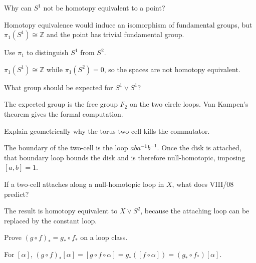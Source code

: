 \begin{problem}\label{prob:viii09-12}
Why can \(S^1\) not be homotopy equivalent to a point?
\end{problem}
\begin{solution}
Homotopy equivalence would induce an isomorphism of fundamental groups, but \(\pi_1(S^1)\cong\mathbb Z\) and the point has trivial fundamental group.
\end{solution}

\begin{problem}\label{prob:viii09-13}
Use \(\pi_1\) to distinguish \(S^1\) from \(S^2\).
\end{problem}
\begin{solution}
\(\pi_1(S^1)\cong\mathbb Z\) while \(\pi_1(S^2)=0\), so the spaces are not homotopy equivalent.
\end{solution}

\begin{problem}\label{prob:viii09-14}
What group should be expected for \(S^1\vee S^1\)?
\end{problem}
\begin{solution}
The expected group is the free group \(F_2\) on the two circle loops.  Van Kampen's theorem gives the formal computation.
\end{solution}

\begin{problem}\label{prob:viii09-15}
Explain geometrically why the torus two-cell kills the commutator.
\end{problem}
\begin{solution}
The boundary of the two-cell is the loop \(aba^{-1}b^{-1}\).  Once the disk is attached, that boundary loop bounds the disk and is therefore null-homotopic, imposing \([a,b]=1\).
\end{solution}

\begin{problem}\label{prob:viii09-16}
If a two-cell attaches along a null-homotopic loop in \(X\), what does VIII/08 predict?
\end{problem}
\begin{solution}
The result is homotopy equivalent to \(X\vee S^2\), because the attaching loop can be replaced by the constant loop.
\end{solution}

\begin{problem}\label{prob:viii09-17}
Prove \((g\circ f)_*=g_*\circ f_*\) on a loop class.
\end{problem}
\begin{solution}
For \([\alpha]\), \((g\circ f)_*[\alpha]=[g\circ f\circ\alpha]=g_*([f\circ\alpha])=(g_*\circ f_*)[\alpha]\).
\end{solution}

